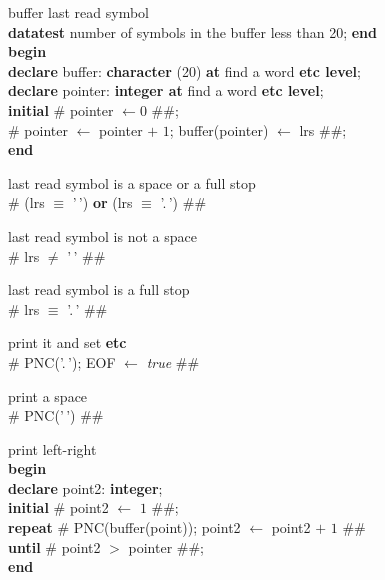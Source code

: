 \documentclass[openany,nobib]{tufte-book}
\newcommand{\kw}[1]{{\bf #1}}
\begin{document}
\noindent buffer last read symbol\\
\-\hspace{0.2cm} \kw{datatest} number of symbols in the buffer less than 20;
\kw{end}\\
\-\hspace{0.2cm} \kw{begin} \\
\-\hspace{0.4cm} \kw{declare} buffer: \kw{character} (20) \kw{at} find a
word \kw{etc level};\\
\-\hspace{0.4cm} \kw{declare} pointer: \kw{integer at} find a word \kw{etc
level};\\
\-\hspace{0.4cm} \kw{initial} \# pointer $\gets 0$ \#\#;\\
\-\hspace{0.4cm} \# pointer $\gets$ pointer $+$ $1$; buffer(pointer) $\gets$
lrs \#\#;\\
\-\hspace{0.2cm} \kw{end}

\clearpage

\noindent last read symbol is a space or a full stop\\
\-\hspace{0.2cm} \# (lrs $\equiv$ '\textvisiblespace\,') \kw{or} (lrs $\equiv$
'.\,') \#\#

\bigskip

\noindent last read symbol is not a space\\
\-\hspace{0.2cm} \# lrs $\neq$ '\textvisiblespace\,' \#\#

\bigskip

\noindent last read symbol is a full stop\\
\-\hspace{0.2cm} \# lrs $\equiv$ '.\,' \#\#

\bigskip

\noindent print it and set \kw{etc} \\
\-\hspace{0.2cm} \# PNC('.\,'); EOF $\gets$ {\it true} \#\#

\bigskip

\noindent print a space\\
\-\hspace{0.2cm} \# PNC('\textvisiblespace\,') \#\#

\bigskip

\noindent print left-right\\
\-\hspace{0.2cm} \kw{begin} \\
\-\hspace{0.4cm} \kw{declare} point2: \kw{integer};\\
\-\hspace{0.4cm} \kw{initial} \# point2 $\gets$ $1$ \#\#;\\
\-\hspace{0.4cm} \kw{repeat} \# PNC(buffer(point)); point2 $\gets$ point2 $+$
$1$
\#\#\\
\-\hspace{0.4cm} \kw{until} \# point2 $>$ pointer \#\#;\\
\-\hspace{0.2cm} \kw{end}
\end{document}
